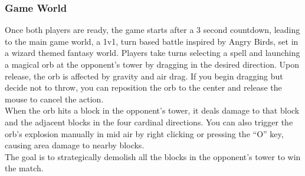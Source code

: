 \documentclass[10.5pt]{article}
\begin{document}
\subsubsection{Game World}
Once both players are ready, the game starts after a 3 second countdown, leading to the main game world, a 1v1, turn based battle inspired by Angry Birds, set in a wizard themed fantasy world. Players take turns selecting a spell and launching a magical orb at the opponent's tower by dragging in the desired direction. Upon release, the orb is affected by gravity and air drag. If you begin dragging but decide not to throw, you can reposition the orb to the center and release the mouse to cancel the action. \\
When the orb hits a block in the opponent's tower, it deals damage to that block and the adjacent blocks in the four cardinal directions. You can also trigger the orb's explosion manually in mid air by right clicking or pressing the “O” key, causing area damage to nearby blocks. \\
The goal is to strategically demolish all the blocks in the opponent's tower to win the match.
\end{document}
